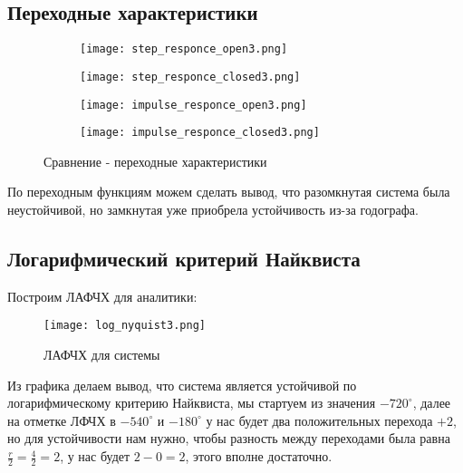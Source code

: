 \subsection{Переходные характеристики}

\begin{figure}[hbt!]
  \begin{subfigure}{.500\linewidth}
    \texttt{[image: step\_responce\_open3.png]}
    \caption{}
  \end{subfigure}\hfill %
  \begin{subfigure}{.500\linewidth}
    \texttt{[image: step\_responce\_closed3.png]}
    \caption{}
  \end{subfigure}
  
  \medskip 
  \begin{subfigure}{.500\linewidth}
    \texttt{[image: impulse\_responce\_open3.png]}
    \caption{}
  \end{subfigure}\hfill 
  \begin{subfigure}{.500\linewidth}
    \texttt{[image: impulse\_responce\_closed3.png]}
    \caption{}
  \end{subfigure}
  \caption{Сравнение - переходные характеристики}
  \end{figure}
По переходным функциям можем сделать вывод, что разомкнутая система была неустойчивой, но замкнутая уже приобрела устойчивость из-за годографа.


\newpage
\subsection{Логарифмический критерий Найквиста}
Построим ЛАФЧХ для аналитики:
\begin{figure}[ht]
    \centering
    \texttt{[image: log\_nyquist3.png]}
    \caption{ЛАФЧХ для системы}
  \end{figure}

Из графика делаем вывод, что система является устойчивой по логарифмическому критерию Найквиста, 
мы стартуем из значения $-720^\circ$, далее на отметке ЛФЧХ в $-540^\circ$ и $-180^\circ$ у нас будет два положительных перехода $+2$, но для устойчивости нам нужно, чтобы разность между переходами была равна $\frac{r}{2}= \frac{4}{2} = 2$, у нас будет $2-0 = 2$, этого вполне достаточно.

\endinput